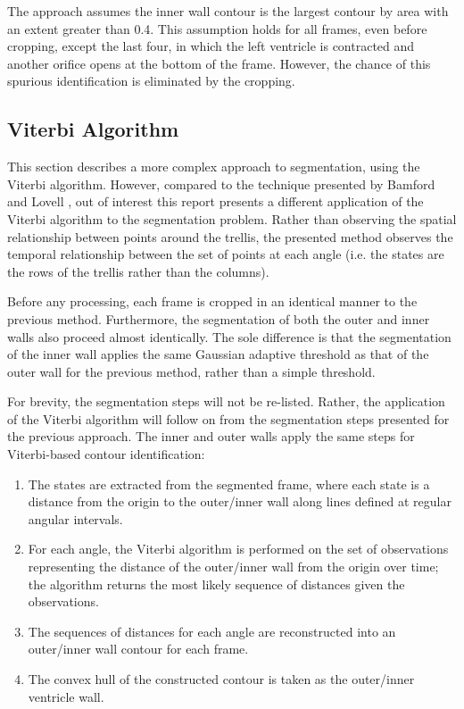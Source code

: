 The approach assumes the inner wall contour is the largest contour by area with an extent greater than 0.4. This assumption holds for all frames, even before cropping, except the last four, in which the left ventricle is contracted and another orifice opens at the bottom of the frame. However, the chance of this spurious identification is eliminated by the cropping.

\subsection{Viterbi Algorithm}

This section describes a more complex approach to segmentation, using the Viterbi algorithm. However, compared to the technique presented by Bamford and Lovell \cite{bamford_1998}, out of interest this report presents a different application of the Viterbi algorithm to the segmentation problem. Rather than observing the spatial relationship between points around the trellis, the presented method observes the temporal relationship between the set of points at each angle (i.e. the states are the rows of the trellis rather than the columns).

Before any processing, each frame is cropped in an identical manner to the previous method. Furthermore, the segmentation of both the outer and inner walls also proceed almost identically. The sole difference is that the segmentation of the inner wall applies the same Gaussian adaptive threshold as that of the outer wall for the previous method, rather than a simple threshold.

For brevity, the segmentation steps will not be re-listed. Rather, the application of the Viterbi algorithm will follow on from the segmentation steps presented for the previous approach. The inner and outer walls apply the same steps for Viterbi-based contour identification:

\begin{enumerate}
  \item The states are extracted from the segmented frame, where each state is a distance from the origin to the outer/inner wall along lines defined at regular angular intervals.

  \item For each angle, the Viterbi algorithm is performed on the set of observations representing the distance of the outer/inner wall from the origin over time; the algorithm returns the most likely sequence of distances given the observations.

  \item The sequences of distances for each angle are reconstructed into an outer/inner wall contour for each frame.

  \item The convex hull of the constructed contour is taken as the outer/inner ventricle wall.

\end{enumerate}

